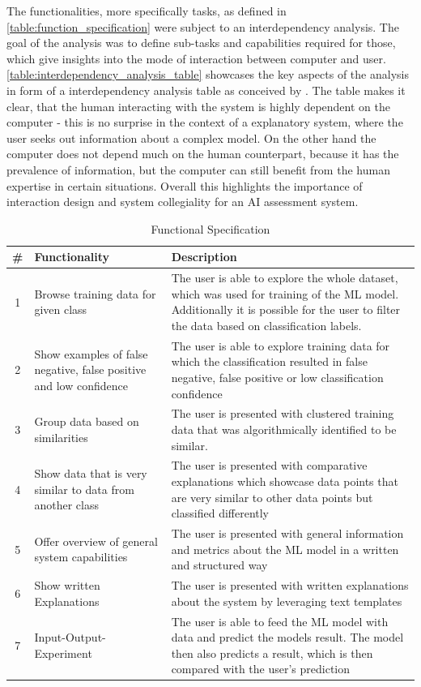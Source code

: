 \documentclass[11pt,a4paper,english]{scrreprt}
\begin{document}
The functionalities, more specifically tasks, as defined in \autoref{table:function_specification} were subject to an interdependency analysis. The goal of the analysis was to define sub-tasks and capabilities required for those, which give insights into the mode of interaction between computer and user. \autoref{table:interdependency_analysis_table} showcases the key aspects of the analysis in form of a interdependency analysis table as conceived by \textcite{johnson_coactive_2014}. The table makes it clear, that the human interacting with the system is highly dependent on the computer - this is no surprise in the context of a explanatory system, where the user seeks out information about a complex model. On the other hand the computer does not depend much on the human counterpart, because it has the prevalence of information, but the computer can still benefit from the human expertise in certain situations. Overall this highlights the importance of interaction design and system collegiality for an AI assessment system.

\begin{table}[htbp]
    \centering
    \begin{tabularx}{\textwidth}{ c X X }
        \toprule
        \# & Functionality & Description \\
        \midrule
        1 & Browse training data for given class & The user is able to explore the whole dataset, which was used for training of the ML model. Additionally it is possible for the user to filter the data based on classification labels. \\ 
        2 & Show examples of false negative, false positive and low confidence & The user is able to explore training data for which the classification resulted in false negative, false positive or low classification confidence \\  
        3 & Group data based on similarities & The user is presented with clustered training data that was algorithmically identified to be similar. \\
        4 & Show data that is very similar to data from another class & The user is presented with comparative explanations which showcase data points that are very similar to other data points but classified differently \\
        5 & Offer overview of general system capabilities & The user is presented with general information and metrics about the ML model in a written and structured way \\
        6 & Show written Explanations & The user is presented with written explanations about the system by leveraging text templates \\
        7 & Input-Output-Experiment & The user is able to feed the ML model with data and predict the models result. The model then also predicts a result, which is then compared with the user's prediction \\
        \bottomrule
    \end{tabularx}
    \caption{Functional Specification}
    \label{table:function_specification}
\end{table}
\end{document}
